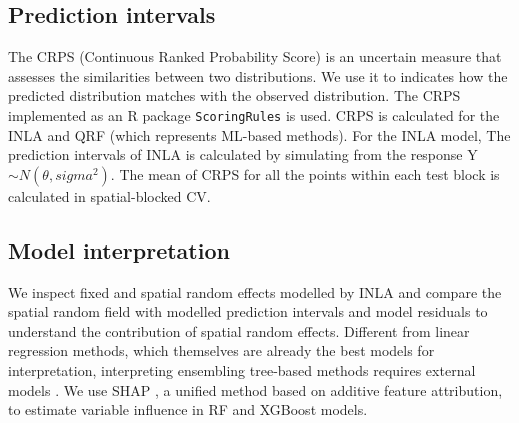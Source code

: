 \documentclass{article}
\begin{document}
\subsection {Prediction intervals}
The CRPS (Continuous Ranked Probability Score) is an uncertain measure that assesses the similarities between two distributions.  We use it to indicates how the predicted distribution matches with the observed distribution. The CRPS implemented as an R package {\tt ScoringRules} \citep{jordan2017evaluating} is used. CRPS is calculated for the INLA and QRF (which represents ML-based methods). For the INLA model, The prediction intervals of INLA is calculated by simulating from the response Y $\sim N(\theta, sigma^2)$. The mean of CRPS for all the points within each test block is calculated in spatial-blocked CV.
 
 


 
\subsection{Model interpretation}
We inspect fixed and spatial random effects modelled by INLA and compare the spatial random field with modelled prediction intervals and model residuals to understand the contribution of spatial random effects. Different from linear regression methods, which themselves are already the best models for interpretation, interpreting ensembling tree-based methods requires external models \citep{NIPS2017_8a20a862}. We use SHAP \citep[SHapley Additive exPlanations,][]{lundberg2018explainable,NIPS2017_8a20a862}, a unified method based on additive feature attribution, to estimate variable influence in RF and XGBoost models.   



\end{document}
